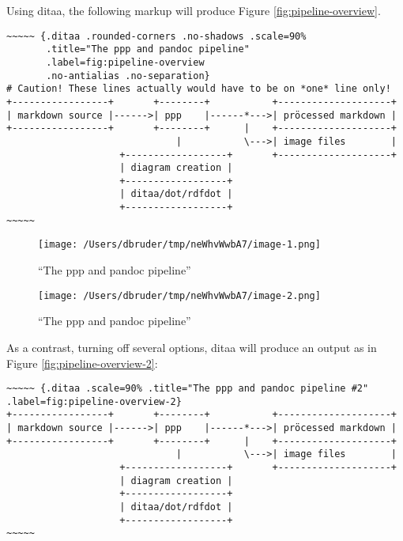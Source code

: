 \documentclass[]{article}
\begin{document}
Using ditaa, the following markup will produce Figure
\ref{fig:pipeline-overview}.

\scriptsize

\begin{verbatim}
~~~~~ {.ditaa .rounded-corners .no-shadows .scale=90%
       .title="The ppp and pandoc pipeline"
       .label=fig:pipeline-overview 
       .no-antialias .no-separation}
# Caution! These lines actually would have to be on *one* line only!
+-----------------+       +--------+           +--------------------+
| markdown source |------>| ppp    |------*--->| pröcessed markdown |
+-----------------+       +--------+      |    +--------------------+
                              |           \--->| image files        |
                    +------------------+       +--------------------+
                    | diagram creation |
                    +------------------+
                    | ditaa/dot/rdfdot |
                    +------------------+
~~~~~
\end{verbatim}

\normalsize

\begin{figure}[htbp]
\centering
\texttt{[image: /Users/dbruder/tmp/neWhvWwbA7/image-1.png]}
\caption{``The ppp and pandoc pipeline''\label{fig:pipeline-overview-x}}
\end{figure}

\begin{figure}[htbp]
\centering
\texttt{[image: /Users/dbruder/tmp/neWhvWwbA7/image-2.png]}
\caption{``The ppp and pandoc pipeline''\label{fig:pipeline-overview-y}}
\end{figure}

As a contrast, turning off several options, ditaa will produce an output
as in Figure \ref{fig:pipeline-overview-2}:

\scriptsize

\begin{verbatim}
~~~~~ {.ditaa .scale=90% .title="The ppp and pandoc pipeline #2" .label=fig:pipeline-overview-2}
+-----------------+       +--------+           +--------------------+
| markdown source |------>| ppp    |------*--->| pröcessed markdown |
+-----------------+       +--------+      |    +--------------------+
                              |           \--->| image files        |
                    +------------------+       +--------------------+
                    | diagram creation |
                    +------------------+
                    | ditaa/dot/rdfdot |
                    +------------------+
~~~~~
\end{verbatim}
\end{document}
